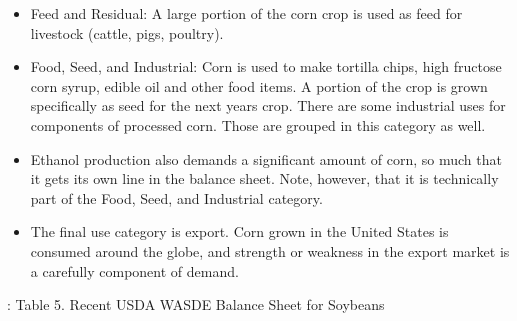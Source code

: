\documentclass[
  letterpaper,
  DIV=11,
  numbers=noendperiod]{scrreprt}
\providecommand{\tightlist}{%
  \setlength{\itemsep}{0pt}\setlength{\parskip}{0pt}}\usepackage{longtable,booktabs,array}
\begin{document}
\begin{itemize}
\tightlist
\item
  Feed and Residual: A large portion of the corn crop is used as feed
  for livestock (cattle, pigs, poultry).
\item
  Food, Seed, and Industrial: Corn is used to make tortilla chips, high
  fructose corn syrup, edible oil and other food items. A portion of the
  crop is grown specifically as seed for the next years crop. There are
  some industrial uses for components of processed corn. Those are
  grouped in this category as well.
\item
  Ethanol production also demands a significant amount of corn, so much
  that it gets its own line in the balance sheet. Note, however, that it
  is technically part of the Food, Seed, and Industrial category.
\item
  The final use category is export. Corn grown in the United States is
  consumed around the globe, and strength or weakness in the export
  market is a carefully component of demand.
\end{itemize}

: Table 5. Recent USDA WASDE Balance Sheet for Soybeans
\end{document}
